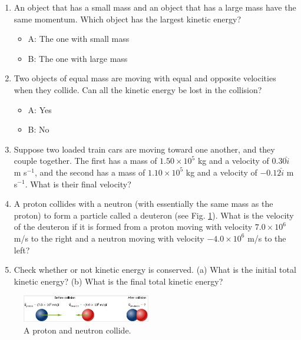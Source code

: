 \documentclass{article}
\begin{document}
\begin{enumerate}
\item An object that has a small mass and an object that has a large mass have the same momentum. Which object has the largest kinetic energy?
\begin{itemize}
\item A: The one with small mass
\item B: The one with large mass
\end{itemize}
\item Two objects of equal mass are moving with equal and opposite velocities when they collide. Can all the kinetic energy be lost in the collision? 
\begin{itemize}
\item A: Yes
\item B: No
\end{itemize}
\item Suppose two loaded train cars are moving toward one another, and they couple together.  The first has a mass of $1.50\times 10^5$ kg and a velocity of $0.30\hat{i}$ m s$^{-1}$, and the second has a mass of $1.10\times 10^5$ kg and a velocity of $−0.12\hat{i}$ m s$^{-1}$. What is their final velocity? \\ \vspace{3cm}
\item A proton collides with a neutron (with essentially the same mass as the proton) to form a particle called a deuteron (see Fig. \ref{fig:deu}). What is the velocity of the deuteron if it is formed from a proton moving with velocity $7.0 \times 10^{6}$ m/s to the right and a neutron moving with velocity $-4.0 \times 10^{6}$ m/s to the left? \\ \vspace{3cm}
\item Check whether or not kinetic energy is conserved.  (a) What is the initial total kinetic energy? (b) What is the final total kinetic energy?
\end{enumerate}

\begin{figure}
\centering
\includegraphics[width=0.5\textwidth]{deuteron.png}
\caption{\label{fig:deu} A proton and neutron collide.}
\end{figure}
\end{document}
